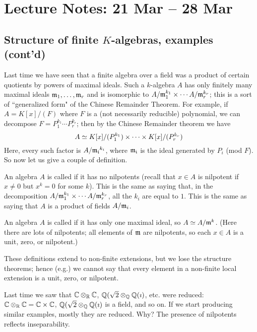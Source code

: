 \section{Lecture Notes: 21 Mar -- 28 Mar}

\subsection{Structure of finite $K$-algebras, examples (cont'd)}
Last time we have seen that a finite algebra over a field was a product of certain quotients by powers of maximal ideals. 
Such a $k$-algebra $A$ has only finitely many maximal ideals $\mathfrak{m}_1, \dotsc, \mathfrak{m}_r$ and is isomorphic to $A / \mathfrak{m}_1^{k_1} \times \dotsb A / \mathfrak{m}_r^{k_r}$; this is a sort of ``generalized form" of the Chinese Remainder Theorem.
For example, if $A = K[x] / (F)$ where $F$ is a (not necessarily reducible) polynomial, we can decompose $F = P_1^{k_1} \dotsb P_r^{k_r}$; then by the Chinese Remainder theorem we have \[ A \simeq K[x] / (P_1^{k_1}) \times \dotsb \times K[x] / (P_r^{k_r})\] 
Here, every such factor is $A / \mathfrak{m_i}^{k_i}$, where $\mathfrak{m_i}$ is the ideal generated by $P_i$ (mod $F$).
So now let us give a couple of definition.
\begin{dfn} 
An algebra $A$ is called  if it has no nilpotents (recall that $x \in A$ is nilpotent if $x \neq 0$ but $x^k = 0$ for some $k$).
This is the same as saying that, in the decomposition $A / \mathfrak{m}_1^{k_1} \times \dotsb A / \mathfrak{m}_r^{k_r}$, all the $k_i$ are equal to $1$.
This is the same as saying that $A$ is a product of fields $A / \mathfrak{m}_i$.
\end{dfn}

\begin{dfn}
An algebra $A$ is called  if it has only one maximal ideal, so $A \simeq A / \mathfrak{m}^{k}$.
(Here there are lots of nilpotents; all elements of $\mathfrak{m}$ are nilpotents, so each $x \in A$ is a unit, zero, or nilpotent.)
\end{dfn}
These definitions extend to non-finite extensions, but we lose the structure theorems; hence (e.g.) we cannot say that every element in a non-finite local extension is a unit, zero, or nilpotent.

Last time we saw that $\mathbb{C} \otimes_{\mathbb{R}} \mathbb{C}$, $\mathbb{Q}(\sqrt{2} \otimes_{\mathbb{Q}} \mathbb{Q}(\imath)$, etc. were reduced: $\mathbb{C} \otimes_{\mathbb{R}} \mathbb{C} = \mathbb{C} \times \mathbb{C}$, $\mathbb{Q}(\sqrt{2} \otimes_{\mathbb{Q}} \mathbb{Q}(\imath)$ is a field, and so on.
If we start producing similar examples, mostly they are reduced.
Why?
The presence of nilpotents reflects inseparability.

